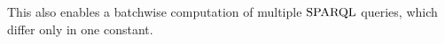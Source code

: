 This also enables a batchwise computation of multiple $\mathrm{SPARQL}$ queries, which differ only in one constant.


%
%
